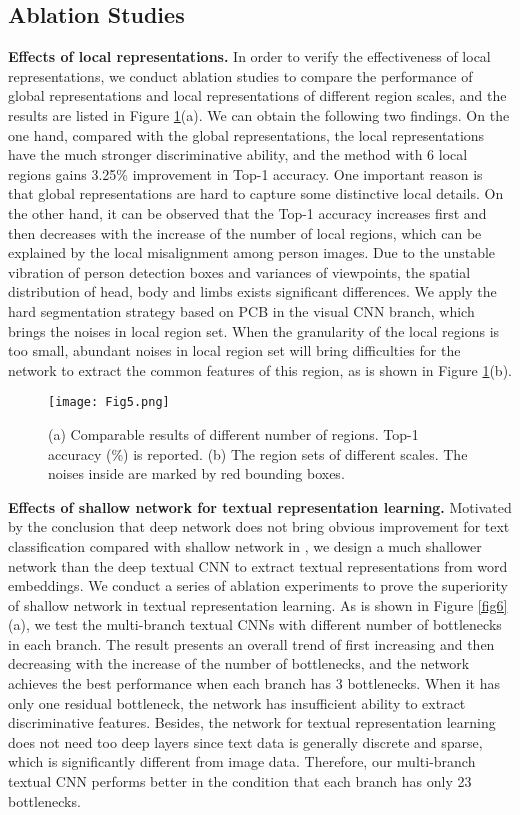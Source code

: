 \documentclass[review]{elsarticle}
\begin{document}
\subsection{Ablation Studies}
\textbf{Effects of local representations.} In order to verify the effectiveness of local representations, we conduct ablation studies to compare the performance of global representations and local representations of different region scales, and the results are listed in Figure \ref{fig5}(a). We can obtain the following two findings. On the one hand, compared with the global representations, the local representations have the much stronger discriminative ability, and the method with 6 local regions gains 3.25\% improvement in Top-1 accuracy. One important reason is that global representations are hard to capture some distinctive local details. On the other hand, it can be observed that the Top-1 accuracy increases first and then decreases with the increase of the number of local regions, which can be explained by the local misalignment among person images. Due to the unstable vibration of person detection boxes and variances of viewpoints, the spatial distribution of head, body and limbs exists significant differences. We apply the hard segmentation strategy based on PCB \cite{2} in the visual CNN branch, which brings the noises in local region set. When the granularity of the local regions is too small, abundant noises in local region set will bring difficulties for the network to extract the common features of this region, as is shown in Figure \ref{fig5}(b).

\begin{figure}[!t]
\centering
\texttt{[image: Fig5.png]}\\
\caption{(a) Comparable results of different number of regions. Top-1 accuracy (\%) is reported. (b) The region sets of different scales. The noises inside are marked by red bounding boxes.}
\label{fig5}
\end{figure}


\textbf{Effects of shallow network for textual representation learning.} Motivated by the conclusion that deep network does not bring obvious improvement for text classification compared with shallow network in \cite{50}, we design a much shallower network than the deep textual CNN \cite{12} to extract textual representations from word embeddings. We conduct a series of ablation experiments to prove the superiority of shallow network in textual representation learning. As is shown in Figure \ref{fig6}(a), we test the multi-branch textual CNNs with different number of bottlenecks in each branch. The result presents an overall trend of first increasing and then decreasing with the increase of the number of bottlenecks, and the network achieves the best performance when each branch has 3 bottlenecks. When it has only one residual bottleneck, the network has insufficient ability to extract discriminative features. Besides, the network for textual representation learning does not need too deep layers since text data is generally discrete and sparse, which is significantly different from image data. Therefore, our multi-branch textual CNN performs better in the condition that each branch has only 23 bottlenecks.
\end{document}
